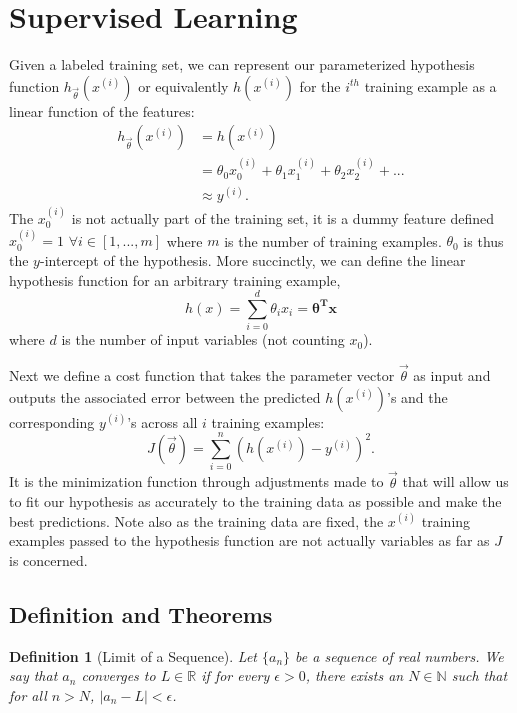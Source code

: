 \documentclass[11pt]{article}
\newtheorem{definition}[theorem]{Definition}
\newcommand{\R}{\mathbb{R}}
\newcommand{\N}{\mathbb{N}}
\newcommand{\BS}{\boldsymbol}
\newcommand{\MBF}{\mathbf}
\newcommand{\VTH}{\vec{\theta}}
\newcommand{\ithx}{x^{(i)}}
\begin{document}
\section{Supervised Learning}

Given a labeled training set, we can represent our parameterized hypothesis function
$h_{\VTH}(\ithx)$ or equivalently $h(\ithx)$ for the $i^{th}$ training example as a linear
function of the features:
\begin{align*}
    h_{\VTH}(\ithx) &= h(\ithx)\\
                      &= \theta_{0}x_{0}^{(i)}+\theta_{1}x_{1}^{(i)}+\theta_{2}x_{2}^{(i)}+...\\
                      &\approx y^{(i)}.
\end{align*}
The $x_{0}^{(i)}$ is not actually part of the training set, it is a dummy feature defined
$x_{0}^{(i)}=1$ $\forall i \in [1,...,m]$ where $m$ is the number of training examples.
$\theta_{0}$ is thus the $y$-intercept of the hypothesis.
More succinctly, we can define the linear hypothesis function for an arbitrary training example,
\begin{equation}
    h(x) = \sum_{i=0}^{d} \theta_{i}x_{i} = \BS{\theta}^{\MBF{T}}\MBF{x}
\end{equation}
where $d$ is the number of input variables (not counting $x_{0}$).

Next we define a cost function that takes the parameter vector $\VTH$ as input and outputs the
associated error between the predicted $h(\ithx)$'s and the corresponding $y^{(i)}$'s across
all $i$ training examples:
\begin{equation}
    J(\VTH) = \sum_{i=0}^{n} (h(\ithx)-y^{(i)})^{2}.
\end{equation}
It is the minimization function through adjustments made to $\VTH$ that will allow us to fit our
hypothesis as accurately to the training data as possible and make the best predictions. Note also
as the training data are fixed, the $\ithx$ training examples passed to the hypothesis function
are not actually variables as far as $J$ is concerned.

\subsection{Definition and Theorems}
\begin{definition}[Limit of a Sequence]
    Let $\{a_n\}$ be a sequence of real numbers. We say that $a_n$ converges to $L \in \R$ if for every $\epsilon > 0$, there exists an $N \in \N$ such that for all $n > N$, $|a_n - L| < \epsilon$.
\end{definition}
\end{document}
